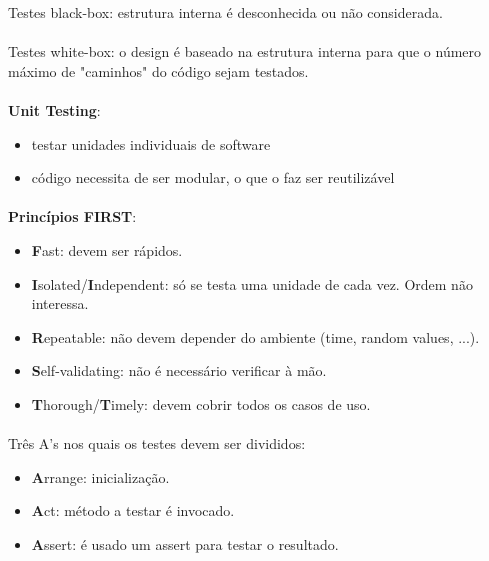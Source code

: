 \documentclass[../resumosLPOO.tex]{subfiles}
\begin{document}
 

Testes black-box: estrutura interna é desconhecida ou não considerada.

\paragraph{}

Testes white-box: o design é baseado na estrutura interna para que o número máximo de "caminhos" do código sejam testados.

\paragraph{}

\textbf{Unit Testing}:
\begin{itemize}
    \item testar unidades individuais de software
    \item código necessita de ser modular, o que o faz ser reutilizável
\end{itemize}

\paragraph{}

\textbf{Princípios FIRST}:
\begin{itemize}
    \item \textbf{F}ast: devem ser rápidos.
    \item \textbf{I}solated/\textbf{I}ndependent: só se testa uma unidade de cada vez. Ordem não interessa.
    \item \textbf{R}epeatable: não devem depender do ambiente (time, random values, ...).
    \item \textbf{S}elf-validating: não é necessário verificar à mão.
    \item \textbf{T}horough/\textbf{T}imely: devem cobrir todos os casos de uso.
\end{itemize}

\paragraph{}

Três A's nos quais os testes devem ser divididos:
\begin{itemize}
    \item \textbf{A}rrange: inicialização.
    \item \textbf{A}ct: método a testar é invocado.
    \item \textbf{A}ssert: é usado um assert para testar o resultado.
\end{itemize}
\end{document}
